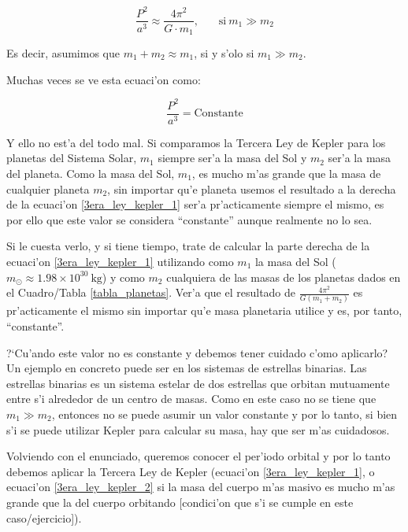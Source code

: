 \documentclass{article}
\begin{document}
\begin{enumerate}[a)]
\begin{enumerate}[i)]
\begin{equation} \label{3era_ley_kepler_2}
\frac{P^2}{a^3} \approx \frac{4 \pi^2}{G \cdot m_1}, \ \ \ \ \ \ \ \ \text{si} \ m_1 \gg m_2
\end{equation}

Es decir, asumimos que $m_1 + m_2 \approx m_1$, si y s'olo si $m_1 \gg m_2$.

Muchas veces se ve esta ecuaci'on como:

\begin{equation*}
\frac{P^2}{a^3} = \text{Constante}
\end{equation*}

Y ello no est'a del todo mal. Si comparamos la Tercera Ley de Kepler para los planetas del Sistema Solar, $m_1$ siempre ser'a la masa del Sol y $m_2$ ser'a la masa del planeta. Como la masa del Sol, $m_1$, es mucho m'as grande que la masa de cualquier planeta $m_2$, sin importar qu'e planeta usemos el resultado a la derecha de la ecuaci'on \eqref{3era_ley_kepler_1} ser'a pr'acticamente siempre el mismo, es por ello que este valor se considera ``constante'' aunque realmente no lo sea.


Si le cuesta verlo, y si tiene tiempo, trate de calcular la parte derecha de la ecuaci'on \eqref{3era_ley_kepler_1} utilizando como $m_1$ la masa del Sol ($m_\odot \approx 1.98 \times 10^{30} \ \text{kg}$) y como $m_2$ cualquiera de las masas de los planetas dados en el Cuadro/Tabla \ref{tabla_planetas}. Ver'a que el resultado de $\frac{4 \pi^2}{G (m_1 + m_2)}$ es pr'acticamente el mismo sin importar qu'e masa planetaria utilice y es, por tanto, ``constante''.

?`Cu'ando este valor no es constante y debemos tener cuidado c'omo aplicarlo? Un ejemplo en concreto puede ser en los sistemas de estrellas binarias. Las estrellas binarias es un sistema estelar de dos estrellas que orbitan mutuamente entre s'i alrededor de un centro de masas. Como en este caso no se tiene que $m_1 \gg m_2$, entonces no se puede asumir un valor constante y por lo tanto, si bien s'i se puede utilizar Kepler para calcular su masa, hay que ser m'as cuidadosos.

\vspace{3mm}

Volviendo con el enunciado, queremos conocer el per'iodo orbital y por lo tanto debemos aplicar la Tercera Ley de Kepler (ecuaci'on \eqref{3era_ley_kepler_1}, o ecuaci'on \eqref{3era_ley_kepler_2} si la masa del cuerpo m'as masivo es mucho m'as grande que la del cuerpo orbitando [condici'on que s'i se cumple en este caso/ejercicio]). 


\end{enumerate}
\end{enumerate}
\end{document}
